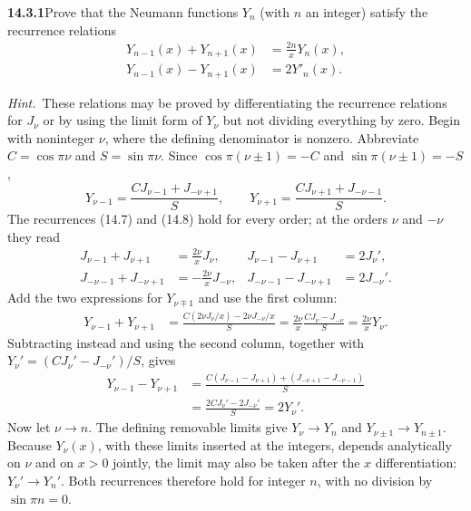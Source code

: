 \par\bigskip
\noindent\textbf{14.3.1}\quad Prove that the Neumann functions $Y_{n}$
(with $n$ an integer) satisfy the recurrence relations
\begin{align*}
Y_{n-1}(x)+Y_{n+1}(x)&=\frac{2n}{x}Y_{n}(x),\\
Y_{n-1}(x)-Y_{n+1}(x)&=2Y'_{n}(x).
\end{align*}
\par\emph{Hint.}~These relations may be proved by differentiating the
recurrence relations for $J_{\nu}$ or by using the limit form of
$Y_{\nu}$ but not dividing everything by zero.
\solution
Begin with noninteger $\nu$, where the defining denominator is
nonzero. Abbreviate $C=\cos\pi\nu$ and $S=\sin\pi\nu$.
Since $\cos\pi(\nu\pm1)=-C$ and $\sin\pi(\nu\pm1)=-S$,
\[
Y_{\nu-1}=\frac{CJ_{\nu-1}+J_{-\nu+1}}S,\qquad
Y_{\nu+1}=\frac{CJ_{\nu+1}+J_{-\nu-1}}S.
\]
The recurrences (14.7) and (14.8) hold for every order; at the
orders $\nu$ and $-\nu$ they read
\begin{align*}
J_{\nu-1}+J_{\nu+1}&=\frac{2\nu}xJ_\nu,&
J_{\nu-1}-J_{\nu+1}&=2J_\nu',\\
J_{-\nu-1}+J_{-\nu+1}&=-\frac{2\nu}xJ_{-\nu},&
J_{-\nu-1}-J_{-\nu+1}&=2J_{-\nu}'.
\end{align*}
Add the two expressions for $Y_{\nu\mp1}$ and use the first column:
\begin{align*}
Y_{\nu-1}+Y_{\nu+1}
&=\frac{C(2\nu J_\nu/x)-2\nu J_{-\nu}/x}S
=\frac{2\nu}{x}\frac{CJ_\nu-J_{-\nu}}S
=\frac{2\nu}{x}Y_\nu.
\end{align*}
Subtracting instead and using the second column, together with
$Y_\nu'=(CJ_\nu'-J_{-\nu}')/S$, gives
\begin{align*}
Y_{\nu-1}-Y_{\nu+1}
&=\frac{C(J_{\nu-1}-J_{\nu+1})
 +(J_{-\nu+1}-J_{-\nu-1})}S\\
&=\frac{2CJ_\nu'-2J_{-\nu}'}S=2Y_\nu'.
\end{align*}
Now let $\nu\to n$. The defining removable limits give
$Y_\nu\to Y_n$ and $Y_{\nu\pm1}\to Y_{n\pm1}$. Because $Y_\nu(x)$,
with these limits inserted at the integers, depends analytically on
$\nu$ and on $x>0$ jointly, the limit may also be taken after the
$x$ differentiation: $Y_\nu'\to Y_n'$. Both recurrences therefore
hold for integer $n$, with no division by $\sin\pi n=0$.

